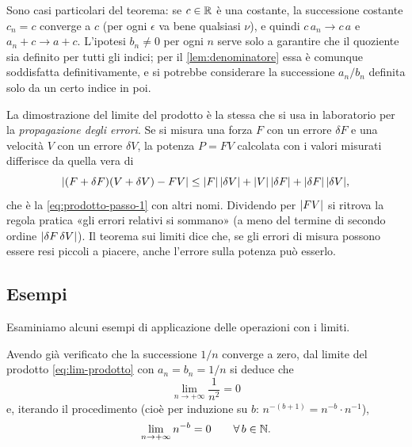 \begin{osservazione}
Sono casi particolari del teorema: se $c\in\mathbb{R}$ è una costante, la successione costante
$c_{n}=c$ converge a $c$ (per ogni $\epsilon$ va bene qualsiasi $\nu$), e quindi
$c\,a_{n}\to c\,a$ e $a_{n}+c\to a+c$. L'ipotesi $b_{n}\neq0$ per ogni $n$ serve solo a
garantire che il quoziente sia definito per tutti gli indici; per il
\cref{lem:denominatore} essa è comunque soddisfatta definitivamente, e si potrebbe
considerare la successione $a_{n}/b_{n}$ definita solo da un certo indice in poi.
\end{osservazione}

\begin{idea}
La dimostrazione del limite del prodotto è la stessa che si usa in laboratorio per la
\emph{propagazione degli errori}. Se si misura una forza $F$ con un errore $\delta F$ e
una velocità $V$ con un errore $\delta V$, la potenza $P=FV$ calcolata con i valori
misurati differisce da quella vera di
\[
  \lvert (F+\delta F)(V+\delta V)-FV\rvert\le\lvert F\rvert\,\lvert \delta V\rvert+\lvert V\rvert\,\lvert \delta F\rvert+\lvert \delta F\rvert\,\lvert \delta V\rvert,
\]
che è la \eqref{eq:prodotto-passo-1} con altri nomi. Dividendo per $\lvert FV\rvert$ si ritrova la
regola pratica «gli errori relativi si sommano» (a meno del termine di secondo ordine
$\lvert \delta F\,\delta V\rvert$). Il teorema sui limiti dice che, se gli errori di misura
possono essere resi piccoli a piacere, anche l'errore sulla potenza può esserlo.
\end{idea}

\subsection{Esempi}

Esaminiamo alcuni esempi di applicazione delle operazioni con i limiti.

\begin{esempio}\label{es:n-alla-meno-b}
Avendo già verificato che la successione $1/n$ converge a zero, dal limite del prodotto
\eqref{eq:lim-prodotto} con $a_{n}=b_{n}=1/n$ si deduce che
\begin{equation}\label{eq:lim-1n2}
  \lim_{n\to+\infty}\frac1{n^{2}}=0
\end{equation}
e, iterando il procedimento (cioè per induzione su $b$: $n^{-(b+1)}=n^{-b}\cdot n^{-1}$),
\begin{equation}\label{eq:lim-n-meno-b}
  \lim_{n\to+\infty}n^{-b}=0 \qquad\forall\, b\in\mathbb{N} .
\end{equation}
\end{esempio}

